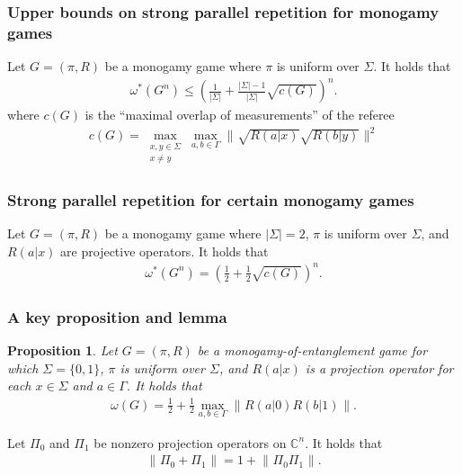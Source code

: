 \documentclass{beamer}
\newcommand{\tinyspace}{\mspace{1mu}}
\newcommand{\abs}[1]{\lvert #1 \rvert}
\newcommand{\norm}[1]{\lVert\tinyspace #1 \tinyspace\rVert}
\newcommand{\biggnorm}[1]{\biggl\lVert\tinyspace #1 \tinyspace\biggr\rVert}
\def\complex{\mathbb{C}}
\newtheorem{prop}[theorem]{Proposition}
\begin{document}
\begin{frame}
	\frametitle{Upper bounds on strong parallel repetition for monogamy games}
	\begin{theorem}
		Let $G = (\pi,R)$ be a monogamy game where $\pi$ is uniform over $\Sigma$. It holds that 
		\begin{align*}
			\omega^*(G^n) \leq \left( \frac{1}{\abs{\Sigma}} + \frac{\abs{\Sigma} - 1}{\abs{\Sigma}} \sqrt{c(G)} \right)^n. 
		\end{align*}
where $c(G)$ is the ``maximal overlap of measurements'' of the referee
	\begin{align*}
		c(G) = \max_{ \substack{ x,y \in \Sigma \\ x \not= y } } \max_{a,b \in \Gamma} \biggnorm{ \sqrt{R(a|x)} \sqrt{R(b|y)} }^2
	\end{align*}
	\end{theorem}		
\end{frame}   

\begin{frame}
	\frametitle{Strong parallel repetition for certain monogamy games}
		\begin{theorem}
		Let $G = (\pi,R)$ be a monogamy game where $\abs{\Sigma} = 2$, $\pi$ is uniform over $\Sigma$, and $R(a|x)$ are projective operators. It holds that 
		\begin{align*}
			\omega^*(G^n) = \left( \frac{1}{2} + \frac{1}{2} \sqrt{c(G)} \right)^n. 
		\end{align*}
	\end{theorem}

\end{frame}     

\begin{frame}
	\frametitle{A key proposition and lemma}
	\begin{prop}
		Let $G = (\pi,R)$ be a monogamy-of-entanglement game for which $\Sigma = \{0,1\}$, $\pi$ is uniform over $\Sigma$, and $R(a|x)$ is a projection operator for each $x \in \Sigma$ and $a \in \Gamma$. It holds that 
		\begin{align*}
			\omega(G) = \frac{1}{2} + \frac{1}{2} \max_{a,b \in \Gamma} \biggnorm{R(a|0)R(b|1)}.
		\end{align*}
	\end{prop}
	\vspace{2mm}
	\begin{lemma}
		Let $\Pi_0$ and $\Pi_1$ be nonzero projection operators on $\complex^n$. It holds that 
		\begin{align*}
			\norm{\Pi_0 + \Pi_1} = 1 + \norm{\Pi_0 \Pi_1}.
		\end{align*}
	\end{lemma}
\end{frame}
\end{document}
